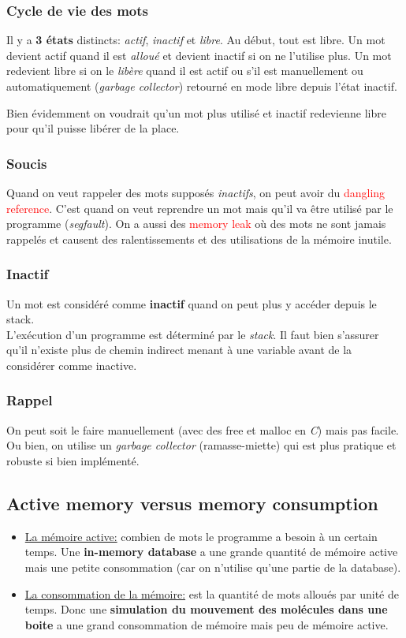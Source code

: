 \documentclass{report}
\begin{document}
\subsubsection{Cycle de vie des mots}
Il y a \textbf{3 états} distincts: \textit{actif}, \textit{inactif} et \textit{libre}. Au début, tout est libre. Un mot devient actif quand il est \textit{alloué} et devient inactif si on ne l'utilise plus. Un mot redevient libre si on le \textit{libère} quand il est actif ou s'il est manuellement ou automatiquement (\textit{garbage collector}) retourné en mode libre depuis l'état inactif.\par 
Bien évidemment on voudrait qu'un mot plus utilisé et inactif redevienne libre pour qu'il puisse libérer de la place.

\subsubsection{Soucis}
Quand on veut rappeler des mots supposés \textit{inactifs}, on peut avoir du \textcolor{red}{dangling reference}. C'est quand on veut reprendre un mot mais qu'il va être utilisé par le programme (\textit{segfault}). On a aussi des \textcolor{red}{memory leak} où des mots ne sont jamais rappelés et causent des ralentissements et des utilisations de la mémoire inutile.

\subsubsection{Inactif}
Un mot est considéré comme \textbf{inactif} quand on peut plus y accéder depuis le stack.\\
L'exécution d'un programme est déterminé par le \textit{stack}. Il faut bien s'assurer qu'il n'existe plus de chemin indirect menant à une variable avant de la considérer comme inactive.

\subsubsection{Rappel}
On peut soit le faire manuellement (avec des free et malloc en \textit{C}) mais pas facile. Ou bien, on utilise un \textit{garbage collector} (ramasse-miette) qui est plus pratique et robuste si bien implémenté.

\subsection{Active memory versus memory consumption}
\begin{itemize}
\item \underline{La mémoire active:} combien de mots le programme a besoin à un certain temps. Une \textbf{in-memory database} a une grande quantité de mémoire active mais une petite consommation (car on n'utilise qu'une partie de la database).
\item \underline{La consommation de la mémoire:} est la quantité de mots alloués par unité de temps. Donc une \textbf{simulation du mouvement des molécules dans une boite} a une grand consommation de mémoire mais peu de mémoire active.
\end{itemize}
\end{document}
